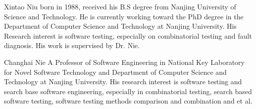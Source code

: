 \documentclass[10pt,journal,cspaper,compsoc]{IEEEtran}
\begin{document}
%

\begin{IEEEbiography}{Xintao Niu}
born in 1988, received his B.S degree from Nanjing University of Science and Technology. He is currently
working toward the PhD degree in the Department of Computer Science and Technology at
Nanjing University. His Research interest is software testing, especially on combinatorial testing and fault diagnosis. His work is supervised by Dr. Nie.
\end{IEEEbiography}

\begin{IEEEbiography}{Changhai Nie}
A Professor of Software Engineering in National Key Laboratory for Novel Software Technology and Department of Computer Science and Technology at Nanjing University. His research interest is software testing and search base software engineering, especially in combinatorial testing, search based software testing, software testing methods comparison and combination and et al.
\end{IEEEbiography}
\end{document}
